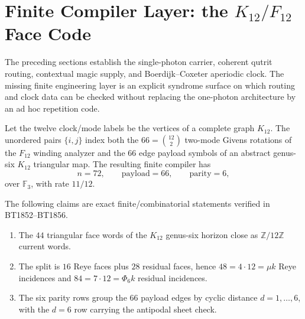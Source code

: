 
\section{Finite Compiler Layer: the \texorpdfstring{$K_{12}/F_{12}$}{K12/F12} Face Code}\label{sec:k12-f12-compiler}

The preceding sections establish the single-photon carrier, coherent qutrit routing,
contextual magic supply, and Boerdijk--Coxeter aperiodic clock.  The missing finite
engineering layer is an explicit syndrome surface on which routing and clock data can
be checked without replacing the one-photon architecture by an ad hoc repetition code.

\begin{definition}
Let the twelve clock/mode labels be the vertices of a complete graph $K_{12}$.
The unordered pairs $\{i,j\}$ index both the $66=\binom{12}{2}$ two-mode
Givens rotations of the $F_{12}$ winding analyzer and the $66$ edge payload symbols
of an abstract genus-six $K_{12}$ triangular map.  The resulting finite compiler has
\[
  n=72,\qquad \text{payload}=66,\qquad \text{parity}=6,
\]
over $\mathbb F_3$, with rate $11/12$.
\end{definition}

\begin{theorem}
The following claims are exact finite/combinatorial statements verified in BT1852--BT1856.
\begin{enumerate}
  \item The $44$ triangular face words of the $K_{12}$ genus-six horizon close as
  $\mathbb Z/12\mathbb Z$ current words.
  \item The split is $16$ Reye faces plus $28$ residual faces, hence
  $48=4\cdot 12=\mu k$ Reye incidences and $84=7\cdot12=\Phi_6 k$ residual incidences.
  \item The six parity rows group the $66$ payload edges by cyclic distance
  $d=1,\ldots,6$, with the $d=6$ row carrying the antipodal sheet check.
\end{enumerate}
\end{theorem}

